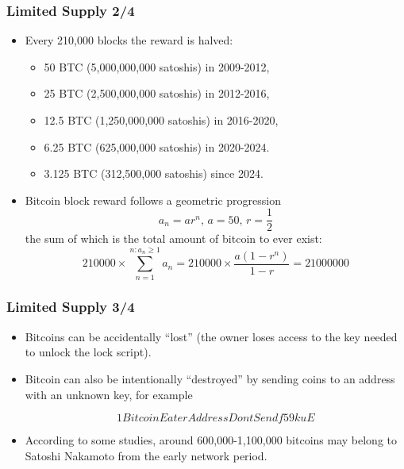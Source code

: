 \documentclass{beamer}
\begin{document}
\begin{frame}
  \frametitle{Limited Supply 2/4}
  \begin{itemize}
  \item Every 210,000 blocks the reward is halved:
    \begin{itemize}
    \item 50 BTC (5,000,000,000 satoshis) in 2009-2012,
    \item 25 BTC (2,500,000,000 satoshis) in 2012-2016,
    \item 12.5 BTC (1,250,000,000 satoshis) in 2016-2020,
    \item 6.25 BTC (625,000,000 satoshis) in 2020-2024.
    \item 3.125 BTC (312,500,000 satoshis) since 2024.
    \end{itemize}
  \item Bitcoin block reward follows a geometric progression
    $$a_n = ar^n \text{, } a = 50 \text{, } r = \frac{1}{2}$$
    the sum of which is the total amount of bitcoin to ever exist:
    $$210000 \times \sum_{n = 1}^{n: a_n \geq 1} a_n = 210000 \times \frac{a(1 -
      r^n)}{1 - r} = 21000000$$
  \end{itemize}
\end{frame}

\begin{frame}
  \frametitle{Limited Supply 3/4}
  \begin{itemize}
  \item Bitcoins can be accidentally ``lost'' (the owner loses access to the key
    needed to unlock the lock script).
  \item Bitcoin can also be intentionally ``destroyed'' by sending coins to an
    address with an unknown key, for example
    \begin{small}
      $$1BitcoinEaterAddressDontSendf59kuE$$
    \end{small}
  \item According to some studies, around 600,000-1,100,000 bitcoins may belong
    to Satoshi Nakamoto from the early network period.
  \end{itemize}
\end{frame}
\end{document}
